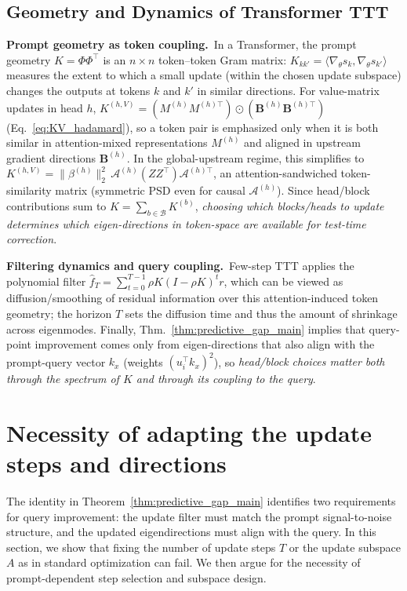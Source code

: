 \documentclass{article}
\theoremstyle{plain}
\theoremstyle{definition}
\theoremstyle{remark}
\begin{document}
\subsection{Geometry and Dynamics of Transformer TTT}

\textbf{Prompt geometry as token coupling.}\,
In a Transformer, the prompt geometry \(K=\Phi\Phi^\top\) is an \(n\times n\) token--token Gram matrix: \(K_{kk'}=\langle \nabla_\theta s_k,\nabla_\theta s_{k'}\rangle\) measures the extent to which a small update (within the chosen update subspace) changes the outputs at tokens \(k\) and \(k'\) in similar directions. For value-matrix updates in head \(h\), \(K^{(h,V)}=(M^{(h)}M^{(h)\top})\odot(\mathbf{B}^{(h)}\mathbf{B}^{(h)\top})\) (Eq.~\eqref{eq:KV_hadamard}), so a token pair is emphasized only when it is both similar in attention-mixed representations \(M^{(h)}\) and aligned in upstream gradient directions \(\mathbf{B}^{(h)}\). In the global-upstream regime, this simplifies to \(K^{(h,V)}=\|\beta^{(h)}\|_2^2\,\mathcal{A}^{(h)}(ZZ^\top)\mathcal{A}^{(h)\top}\), an attention-sandwiched token-similarity matrix (symmetric PSD even for causal \(\mathcal{A}^{(h)}\)). Since head/block contributions sum to \(K=\sum_{b\in\mathcal B}K^{(b)}\), \emph{choosing which blocks/heads to update determines which eigen-directions in token-space are available for test-time correction}.

\textbf{Filtering dynamics and query coupling.}\,
Few-step TTT applies the polynomial filter $\hat f_T=\sum_{t=0}^{T-1}\rho K(I-\rho K)^t r$, which can be viewed as diffusion/smoothing of residual information over this attention-induced token geometry; the horizon $T$ sets the diffusion time and thus the amount of shrinkage across eigenmodes. Finally, Thm.~\ref{thm:predictive_gap_main} implies that query-point improvement comes only from eigen-directions that also align with the prompt-query vector $k_x$ (weights $(u_i^\top k_x)^2$), so \emph{head/block choices matter both through the spectrum of $K$ and through its coupling to the query}.



\section{Necessity of adapting the update steps and directions}\label{sec:three_implications}

The identity in Theorem~\ref{thm:predictive_gap_main} identifies two requirements for query improvement: the update filter must match the prompt signal-to-noise structure, and the updated eigendirections must align with the query. 
In this section, we show that fixing the number of update steps $T$ or the update subspace $A$ as in standard optimization can fail. We then argue for the necessity of prompt-dependent step selection and subspace design.
\end{document}
